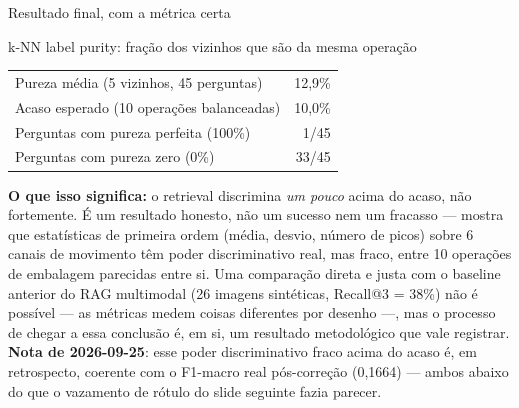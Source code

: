 \documentclass{beamer}
\newenvironment{numerobloco}[1]{\begin{block}{#1}}{\end{block}}
\begin{document}
\begin{frame}{Resultado final, com a métrica certa}
  \small
  \begin{numerobloco}{k-NN label purity: fração dos vizinhos que são da mesma operação}
    \begin{center}
    \begin{tabular}{lr}
      \toprule
      Pureza média (5 vizinhos, 45 perguntas) & 12,9\% \\
      Acaso esperado (10 operações balanceadas) & 10,0\% \\
      Perguntas com pureza perfeita (100\%) & 1/45 \\
      Perguntas com pureza zero (0\%) & 33/45 \\
      \bottomrule
    \end{tabular}
    \end{center}
  \end{numerobloco}

  \pause
  \textbf{O que isso significa:} o retrieval discrimina \emph{um pouco} acima do acaso, não
  fortemente. É um resultado honesto, não um sucesso nem um fracasso — mostra que estatísticas
  de primeira ordem (média, desvio, número de picos) sobre 6 canais de movimento têm poder
  discriminativo real, mas fraco, entre 10 operações de embalagem parecidas entre si. Uma
  comparação direta e justa com o baseline anterior do RAG multimodal (26 imagens sintéticas,
  Recall@3 = 38\%) não é possível — as métricas medem coisas diferentes por desenho —, mas o
  processo de chegar a essa conclusão é, em si, um resultado metodológico que vale registrar.
  \textbf{Nota de 2026-09-25}: esse poder discriminativo fraco acima do acaso é, em retrospecto,
  coerente com o F1-macro real pós-correção (0,1664) — ambos abaixo do que o vazamento de
  rótulo do slide seguinte fazia parecer.
\end{frame}
\end{document}
